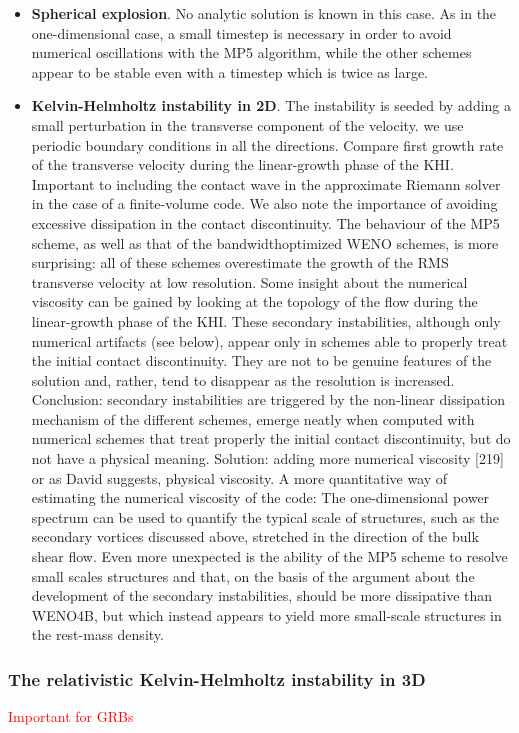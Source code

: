 \documentclass[11pt,a4paper,headinclude=true,DIV=14,BCOR=8mm,chapterprefix,listof=totoc,twoside,openright,abstracton]{scrbook}
\begin{document}
\begin{itemize}
    \item \textbf{Spherical explosion}. No analytic solution is known in this case. As in the one-dimensional case, a small timestep is necessary in order to avoid numerical oscillations with the MP5 algorithm, while the other schemes appear to be stable even with a timestep which is twice as large.
    \item \textbf{Kelvin-Helmholtz instability in 2D}. The instability is seeded by adding a small perturbation in the transverse component of the velocity. we use periodic boundary conditions in all the directions. Compare first growth rate of the transverse velocity during the linear-growth phase of the KHI. Important to including the contact wave in the approximate Riemann solver in the case of a finite-volume code. We also note the     importance of avoiding excessive dissipation in the contact discontinuity. The behaviour of the MP5 scheme, as well as that of the bandwidthoptimized WENO schemes, is more surprising: all of these schemes overestimate the growth of the RMS transverse velocity at low resolution. Some insight about the numerical viscosity can be gained by looking at the
    topology of the flow during the linear-growth phase of the KHI. These secondary
    instabilities, although only numerical artifacts (see below), appear only
    in schemes able to properly treat the initial contact discontinuity. They are not to be genuine features of the solution and, rather, tend to disappear as the resolution is increased. Conclusion: secondary instabilities are triggered by the non-linear dissipation mechanism of the different schemes, emerge neatly when computed with numerical schemes that treat properly the initial contact discontinuity, but do not have a physical meaning. Solution: adding more numerical viscosity [219] or as David suggests, physical viscosity. A more quantitative way of estimating the numerical viscosity of the code: The one-dimensional power spectrum can be used to quantify the typical scale of structures, such as the secondary vortices discussed above, stretched in the direction of the bulk shear flow. Even more unexpected is the ability of the MP5 scheme to resolve small scales structures and that, on the basis of the argument about the development of the secondary instabilities, should be more dissipative than WENO4B, but which instead appears to yield more small-scale structures in the rest-mass density.
\end{itemize}

\subsubsection{The relativistic Kelvin-Helmholtz instability in 3D}
\textcolor{red}{Important for GRBs}
\end{document}
